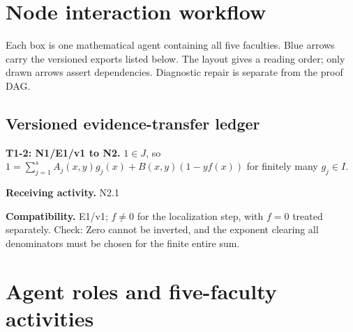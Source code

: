 \documentclass[preprint,12pt,aps,pra,showkeys,amsmath,amssymb,superscriptaddress,floatfix]{revtex4-2}
\theoremstyle{definition}
\theoremstyle{remark}
\newcommand{\field}[2]{\par\smallskip\noindent\textbf{#1.} #2\par}
\begin{document}
\clearpage\section{Node interaction workflow}

\begin{center}\end{center}

Each box is one mathematical agent containing all five faculties. Blue
arrows carry the versioned exports listed below. The layout gives a
reading order; only drawn arrows assert dependencies. Diagnostic repair
is separate from the proof DAG.

\subsection{Versioned evidence-transfer ledger}

\begingroup\small\linespread{1.05}\selectfont

\field{T1-2: N1/E1/v1 to N2}{\(1\in J\), so \(1=\sum_{j=1}^s A_j(x,y)g_j(x)+B(x,y)(1-yf(x))\) for
finitely many \(g_j\in I\).}

\field{Receiving activity}{N2.1}

\field{Compatibility}{E1/v1; \(f\ne0\) for the localization step, with \(f=0\) treated
separately. Check: Zero cannot be inverted, and the exponent clearing
all denominators must be chosen for the finite entire sum.}

\endgroup

\clearpage\section{Agent roles and five-faculty activities}\begingroup\small\linespread{1.05}\selectfont{}
\end{document}
